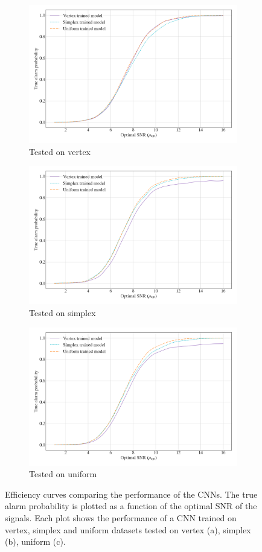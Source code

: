 \documentclass[12pt]{iopart}
\begin{document}
\begin{figure}[h!] %
\centering
\begin{subfigure}{1\textwidth}
\centering
\includegraphics[width=0.7\linewidth]{figures/efficiency_curve_vtest.png}
\caption{Tested on vertex}
\end{subfigure}

\begin{subfigure}{1\textwidth}
\centering
\includegraphics[width=0.7\linewidth]{figures/efficiency_curve_stest.png}
\caption{Tested on simplex}
\end{subfigure}

\begin{subfigure}{1\textwidth}
\centering
\includegraphics[width=0.7\linewidth]{figures/efficiency_curve_utest.png}
\caption{Tested on uniform}
\end{subfigure}

\caption{Efficiency curves comparing the performance of the \acp{CNN}. The true alarm probability is plotted as a function of the optimal \ac{SNR} of the signals. Each plot shows the performance of a \ac{CNN} trained on vertex, simplex and uniform datasets tested on vertex (a), simplex (b), uniform (c).}
\label{fig:eff_curves}
\end{figure}
\end{document}
